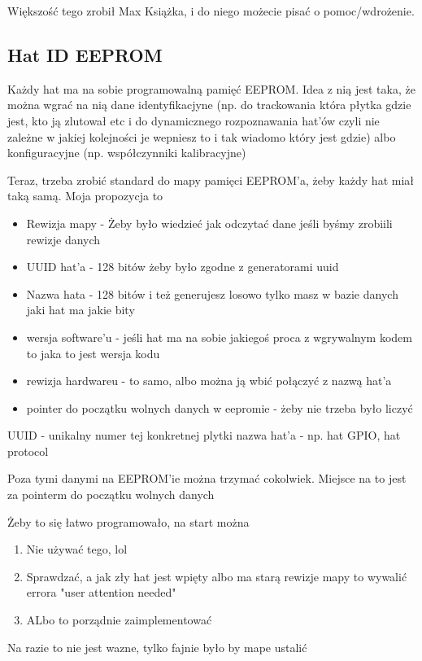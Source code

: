 \documentclass[b5paper, 10pt, twoside]{book}
\begin{document}
Większość tego zrobił Max Książka, i do niego możecie pisać o pomoc/wdrożenie.

\subsection{Hat ID EEPROM}
Każdy hat ma na sobie programowalną pamięć EEPROM. Idea z nią jest taka, że można wgrać na nią dane identyfikacjyne (np. do trackowania która płytka gdzie jest, kto ją zlutował etc i do dynamicznego rozpoznawania hat'ów czyli nie zależne w jakiej kolejności je wepniesz to i tak wiadomo który jest gdzie) albo konfiguracyjne (np. współczynniki kalibracyjne)

Teraz, trzeba zrobić standard do mapy pamięci EEPROM'a, żeby każdy hat miał taką samą. Moja propozycja to

\begin{itemize}
  \item Rewizja mapy - Żeby było wiedzieć jak odczytać dane jeśli byśmy zrobiili rewizje danych
  \item UUID hat'a - 128 bitów żeby było zgodne z generatorami uuid
  \item Nazwa hata - 128 bitów i też generujesz losowo tylko masz w bazie danych jaki hat ma jakie bity
  \item wersja software'u - jeśli hat ma na sobie jakiegoś proca z wgrywalnym kodem to jaka to jest wersja kodu
  \item rewizja hardwareu - to samo, albo można ją wbić połączyć z nazwą hat'a
  \item pointer do początku wolnych danych w eepromie - żeby nie trzeba było liczyć
\end{itemize}

UUID - unikalny numer tej konkretnej plytki
nazwa hat'a - np. hat GPIO, hat protocol

Poza tymi danymi na EEPROM'ie można trzymać cokolwiek. Miejsce na to jest za pointerm do początku wolnych danych

Żeby to się łatwo programowało, na start można
\begin{enumerate}
  \item Nie używać tego, lol
  \item Sprawdzać, a jak zły hat jest wpięty albo ma starą rewizje mapy to wywalić errora "user attention needed"
  \item ALbo to porządnie zaimplementować
\end{enumerate}
Na razie to nie jest wazne, tylko fajnie było by mape ustalić
\end{document}
